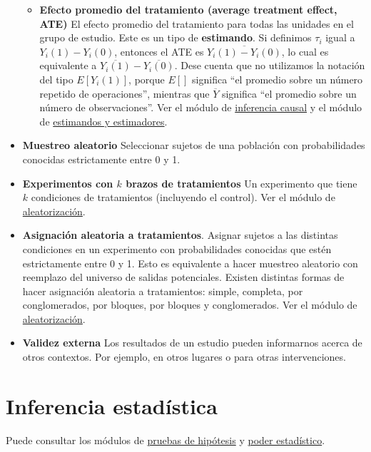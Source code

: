 \documentclass[
  12pt,
  spanish,
]{book}
\providecommand{\tightlist}{%
  \setlength{\itemsep}{0pt}\setlength{\parskip}{0pt}}
\begin{document}
\begin{itemize}
  \begin{itemize}
  \tightlist
  \item
    \textbf{Efecto promedio del tratamiento (average treatment effect, ATE)} El efecto promedio del tratamiento para todas las unidades en el grupo de estudio. Este es un tipo de \textbf{estimando}. Si definimos \(\tau_i\) igual a \(Y_i(1)-Y_i(0)\), entonces el ATE es \(\overline{Y_i(1)-Y_i(0)}\), lo cual es equivalente a \(\overline{{Y}_i(1)}-\overline{{Y}_i(0)}\). Dese cuenta que no utilizamos la notación del tipo \(E[Y_i (1)]\), porque \(E[]\) significa ``el promedio sobre un número repetido de operaciones'', mientras que \(\overline{Y}\) significa ``el promedio sobre un número de observaciones''. Ver el módulo de \href{inferencia-causal.html}{inferencia causal} y el módulo de \href{estimandos-y-estimadores.html}{estimandos y estimadores}.
  \end{itemize}
\item
  \textbf{Muestreo aleatorio} Seleccionar sujetos de una población con
  probabilidades conocidas estrictamente entre 0 y 1.
\item
  \textbf{Experimentos con \(k\) brazos de tratamientos} Un experimento que tiene \(k\) condiciones de tratamientos
  (incluyendo el control). Ver el módulo de \href{aleatorizaciónn.html}{aleatorización}.
\item
  \textbf{Asignación aleatoria a tratamientos}. Asignar sujetos a las distintas condiciones en un experimento con probabilidades conocidas que estén estrictamente entre 0 y 1. Esto es equivalente a hacer muestreo aleatorio con reemplazo del universo de salidas potenciales. Existen distintas formas de hacer asignación aleatoria a tratamientos: simple, completa, por conglomerados, por bloques, por bloques y conglomerados. Ver el módulo de \href{aleatorización.html}{aleatorización}.
\item
  \textbf{Validez externa} Los resultados de un estudio pueden informarnos acerca de otros contextos. Por ejemplo, en otros lugares o para otras intervenciones.
\end{itemize}

\hypertarget{inferencia-estaduxedstica}{%
\section{Inferencia estadística}\label{inferencia-estaduxedstica}}

Puede consultar los módulos de \href{pruebas-de-hipótesis.html}{pruebas de hipótesis} y \href{poder-estadístico-y-diagnosticandos-del-diseño.html}{poder estadístico}.
\end{document}
